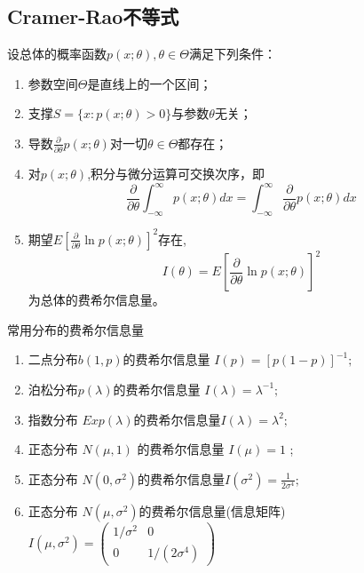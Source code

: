 \subsection{Cramer-Rao不等式}
\begin{definition}
    设总体的概率函数$p(x;\theta),\theta \in \Theta$满足下列条件：
    \begin{enumerate}[(1)]
        \item 参数空间$\Theta$是直线上的一个区间；
        \item 支撑$S=\{x:p(x;\theta)>0\}$与参数$\theta$无关；
        \item 导数$\frac{\partial }{\partial \theta}p(x;\theta)$对一切$\theta \in \Theta$都存在；
        \item 对$p(x;\theta)$,积分与微分运算可交换次序，即
              $$
                  \frac{\partial }{\partial \theta} \int_{-\infty}^{\infty}p(x;\theta)dx = \int_{-\infty}^{\infty}\frac{\partial }{\partial \theta}p(x;\theta)dx
              $$
        \item 期望$E[\frac{\partial }{\partial \theta} \ln p(x;\theta)]^2$存在,
              $$
                  I(\theta)=E[\frac{\partial }{\partial \theta} \ln p(x;\theta)]^2
              $$
              为总体的费希尔信息量。
    \end{enumerate}
\end{definition}
常用分布的费希尔信息量
\begin{enumerate}
    \item 二点分布$b(1,p)$的费希尔信息量 $I(p)=[p(1-p)]^{-1};$
    \item 泊松分布$p(\lambda)$的费希尔信息量 $I(\lambda)=\lambda^{-1};$
    \item 指数分布 $Exp(\lambda)$的费希尔信息量$I(\lambda)=\lambda^2;$
    \item 正态分布 $N(\mu,1)$ 的费希尔信息量 $I(\mu)=1$ ;
    \item 正态分布 $N(0,\sigma^2)$的费希尔信息量$I(\sigma^2)=\frac1{2\sigma^4};$
    \item 正态分布 $N(\mu,\sigma^2)$的费希尔信息量(信息矩阵)$I(\mu,\sigma^2)=\begin{pmatrix}1/\sigma^2&0\\0&1/(2\sigma^4)\end{pmatrix}$

\end{enumerate}


